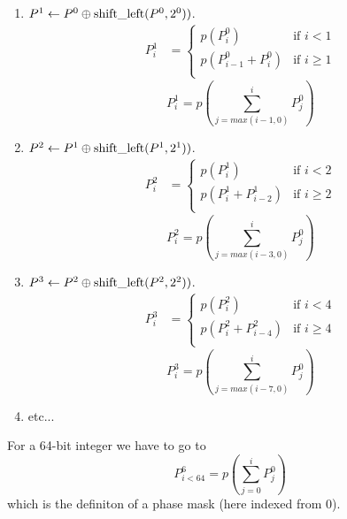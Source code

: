 \documentclass[./thesis.tex]{subfiles}
\begin{document}
\begin{enumerate}
\item
$P^1 \gets P^0 \oplus \text{shift\_left}(P^0,2^0))$.\\
\begin{align}
P^1_i& =
  \begin{cases}
  	p(P^0_i)  & \text{if } i<1 \\
  	p(P_{i-1}^0 + P_{i}^0)   & \text{if } i \geq 1 \\
  \end{cases}
\end{align}
\begin{equation}
P^1_i = p \left (\sum_{j=max(i-1,0)}^{i} P_j^0 \right )
\end{equation}
\item
$P^2 \gets P^1 \oplus \text{shift\_left}(P^1,2^1))$.\\
\begin{align}
P^2_i& =
  \begin{cases}
  	p(P^1_i)  & \text{if } i<2 \\
  	p(P_i^1 + P_{i-2}^1)    & \text{if } i \geq 2 \\
  \end{cases}
\end{align}
\begin{equation}
P^2_i = p \left (\sum_{j=max(i-3,0)}^{i} P_j^0 \right )
\end{equation}
\item
$P^3 \gets P^2 \oplus \text{shift\_left}(P^2,2^2))$.\\
\begin{align}
P^3_i& =
  \begin{cases}
  	p(P^2_i)  & \text{if } i<4 \\
  	p(P_i^2 + P_{i-4}^2)    & \text{if } i \geq 4 \\
  \end{cases}
\end{align}
\begin{equation}
P^3_i = p \left (\sum_{j=max(i-7,0)}^{i} P_j^0 \right )
\end{equation}
\item
etc...
\end{enumerate}
For a 64-bit integer we have to go to 
\begin{equation}
P^6_{i<64} = p \left (\sum_{j=0}^{i} P_j^0 \right )
\end{equation}
which is the definiton of a phase mask (here indexed from $0$).

\end{document}
